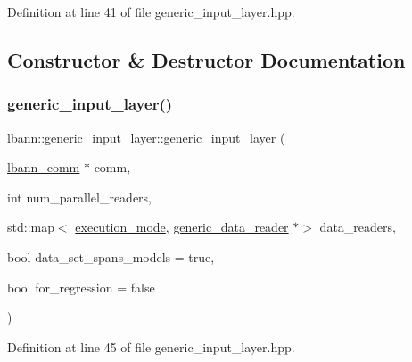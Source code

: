 Definition at line 41 of file generic\+\_\+input\+\_\+layer.\+hpp.



\subsection{Constructor \& Destructor Documentation}
\mbox{\label{classlbann_1_1generic__input__layer_a0c7ce1625cd2be2368822c2662346538}} 
\subsubsection{\texorpdfstring{generic\+\_\+input\+\_\+layer()}{generic\_input\_layer()}\hspace{0.1cm}{\footnotesize\ttfamily [1/2]}}
{\footnotesize\ttfamily lbann\+::generic\+\_\+input\+\_\+layer\+::generic\+\_\+input\+\_\+layer (\begin{DoxyParamCaption}\item[{\hyperlink{classlbann_1_1lbann__comm}{lbann\+\_\+comm} $\ast$}]{comm,  }\item[{int}]{num\+\_\+parallel\+\_\+readers,  }\item[{std\+::map$<$ \hyperlink{base_8hpp_a2781a159088df64ed7d47cc91c4dc0a8}{execution\+\_\+mode}, \hyperlink{classlbann_1_1generic__data__reader}{generic\+\_\+data\+\_\+reader} $\ast$$>$}]{data\+\_\+readers,  }\item[{bool}]{data\+\_\+set\+\_\+spans\+\_\+models = {\ttfamily true},  }\item[{bool}]{for\+\_\+regression = {\ttfamily false} }\end{DoxyParamCaption})\hspace{0.3cm}{\ttfamily [inline]}}



Definition at line 45 of file generic\+\_\+input\+\_\+layer.\+hpp.


